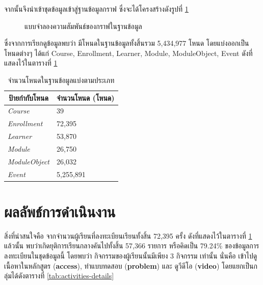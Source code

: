 \documentclass[conference]{IEEEtran}
\def\dropout{ยุติการเรียนกลางคัน}
\newcommand*{\thead}[1]{\multicolumn{1}{c}{\bfseries #1}}
\begin{document}
    จากนั้นจึงนำเข้าชุดข้อมูลเข้าสู่ฐานข้อมูลกราฟ ซึ่งจะได้โครงสร้างดังรูปที่ \ref{fig:graph-modeling}
    \begin{figure}[htbp]
        \caption{แบบจำลองความสัมพันธ์ของกราฟในฐานข้อมูล}
        \label{fig:graph-modeling}
    \end{figure}

    ซึ่งจากการเรียกดูข้อมูลพบว่า มีโหนดในฐานข้อมูลทั้งสิ้นรวม 5,434,977 โหนด 
    โดยแบ่งออกเป็นโหนดต่างๆ ได้แก่ Course, Enrollment, Learner, Module,
    ModuleObject, Event ดังที่แสดงไว้ในตารางที่ \ref{tab:node-details}

    \begin{table}[ht!]
        \caption[nodecountinfo]{จำนวนโหนดในฐานข้อมูลแบ่งตามประเภท}
        \label{tab:node-details}
        \begin{tabular}{p{3cm} p{5cm}}
            \hline
            \thead{ป้ายกำกับโหนด}   & \thead{จำนวนโหนด (โหนด)} \\
            \hline
            \textit{Course}         & 39 \\
            \textit{Enrollment}     & 72,395 \\
            \textit{Learner}        & 53,870 \\
            \textit{Module}         & 26,750 \\
            \textit{ModuleObject}   & 26,032 \\
            \textit{Event}          & 5,255,891 \\
            \hline
        \end{tabular}
    \end{table}

    \section[result]{ผลลัพธ์การดำเนินงาน}

    สิ่งที่น่าสนใจคือ จากจำนวนผู้เรียนที่ลงทะเบียนเรียนทั้งสิ้น 72,395 ครั้ง 
    ดังที่แสดงไว้ในตารางที่ \ref{tab:node-details} แล้วนั้น พบว่าเกิด{\dropout}ไปทั้งสิ้น
    57,366 รายการ หรือคิดเป็น 79.24\% ของข้อมูลการลงทะเบียนในชุดข้อมูลนี้ โดยพบว่า
    กิจกรรมของผู้เรียนนั้นมีเพียง 3 กิจกรรม เท่านั้น นั่นคือ เข้าไปดูเนื้อหาในหลักสูตร (\textbf{access}), 
    ทำแบบทดสอบ (\textbf{problem}) และ ดูวีดีโอ (\textbf{video}) 
    โดยแยกเป็นกลุ่มได้ดังตารางที่ \ref{tab:activities-details}
\end{document}
